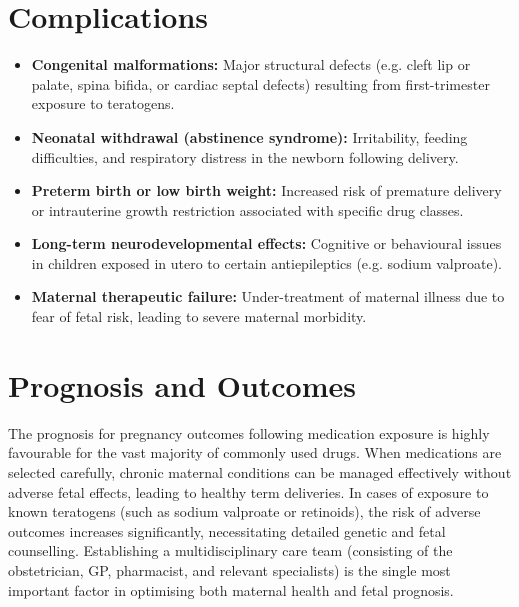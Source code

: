 \section*{Complications}
\begin{itemize}
    \item \textbf{Congenital malformations:} Major structural defects (e.g. cleft lip or palate, spina bifida, or cardiac septal defects) resulting from first-trimester exposure to teratogens.
    \item \textbf{Neonatal withdrawal (abstinence syndrome):} Irritability, feeding difficulties, and respiratory distress in the newborn following delivery.
    \item \textbf{Preterm birth or low birth weight:} Increased risk of premature delivery or intrauterine growth restriction associated with specific drug classes.
    \item \textbf{Long-term neurodevelopmental effects:} Cognitive or behavioural issues in children exposed in utero to certain antiepileptics (e.g. sodium valproate).
    \item \textbf{Maternal therapeutic failure:} Under-treatment of maternal illness due to fear of fetal risk, leading to severe maternal morbidity.
\end{itemize}

\section*{Prognosis and Outcomes}
The prognosis for pregnancy outcomes following medication exposure is highly favourable for the vast majority of commonly used drugs. When medications are selected carefully, chronic maternal conditions can be managed effectively without adverse fetal effects, leading to healthy term deliveries. In cases of exposure to known teratogens (such as sodium valproate or retinoids), the risk of adverse outcomes increases significantly, necessitating detailed genetic and fetal counselling. Establishing a multidisciplinary care team (consisting of the obstetrician, GP, pharmacist, and relevant specialists) is the single most important factor in optimising both maternal health and fetal prognosis.

